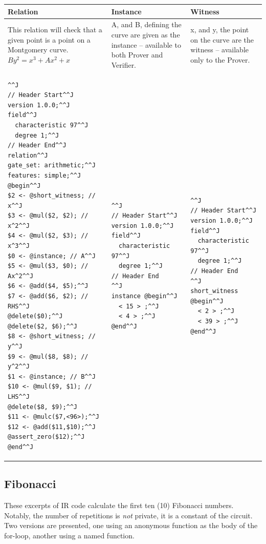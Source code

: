 \documentclass[12pt]{article}
\begin{document}
{
\lstset{language=ir}
\lstset{basicstyle=\scriptsize}
\noindent
\begin{tabularx}{\textwidth}{|X|X|X|}
\hline
\textbf{Relation} & \textbf{Instance} & \textbf{Witness} \\
\hline
This relation will check that a given point is a point on a Montgomery curve.\newline
$By^2 = x^3 + Ax^2 +x$
& A, and B, defining the curve are given as the instance -- available to both Prover and Verifier.
& x, and y, the point on the curve are the witness -- available only to the Prover. \\
\hline
\begin{lstlisting}^^J
// Header Start^^J
version 1.0.0;^^J
field^^J
  characteristic 97^^J
  degree 1;^^J
// Header End^^J
relation^^J
gate_set: arithmetic;^^J
features: simple;^^J
@begin^^J
$2 <- @short_witness; // x^^J
$3 <- @mul($2, $2); // x^2^^J
$4 <- @mul($2, $3); // x^3^^J
$0 <- @instance; // A^^J
$5 <- @mul($3, $0); // Ax^2^^J
$6 <- @add($4, $5);^^J
$7 <- @add($6, $2); // RHS^^J
@delete($0);^^J
@delete($2, $6);^^J
$8 <- @short_witness; // y^^J
$9 <- @mul($8, $8); // y^2^^J
$1 <- @instance; // B^^J
$10 <- @mul($9, $1); // LHS^^J
@delete($8, $9);^^J
$11 <- @mulc($7,<96>);^^J
$12 <- @add($11,$10);^^J
@assert_zero($12);^^J
@end^^J
\end{lstlisting} &
\begin{lstlisting}^^J
// Header Start^^J
version 1.0.0;^^J
field^^J
  characteristic 97^^J
  degree 1;^^J
// Header End
^^J
instance @begin^^J
  < 15 > ;^^J
  < 4 > ;^^J
@end^^J
\end{lstlisting} &
\begin{lstlisting}^^J
// Header Start^^J
version 1.0.0;^^J
field^^J
  characteristic 97^^J
  degree 1;^^J
// Header End
^^J
short_witness @begin^^J
  < 2 > ;^^J
  < 39 > ;^^J
@end^^J
\end{lstlisting} \\
\hline
\end{tabularx}
}

\subsection{Fibonacci}\label{ex_ir1}
These excerpts of IR code calculate the first ten (10) Fibonacci numbers.
Notably, the number of repetitions is \textit{not} private, it is a constant of the circuit.
Two versions are presented, one using an anonymous function as the body of the for-loop, another using a named function.\\
\end{document}
